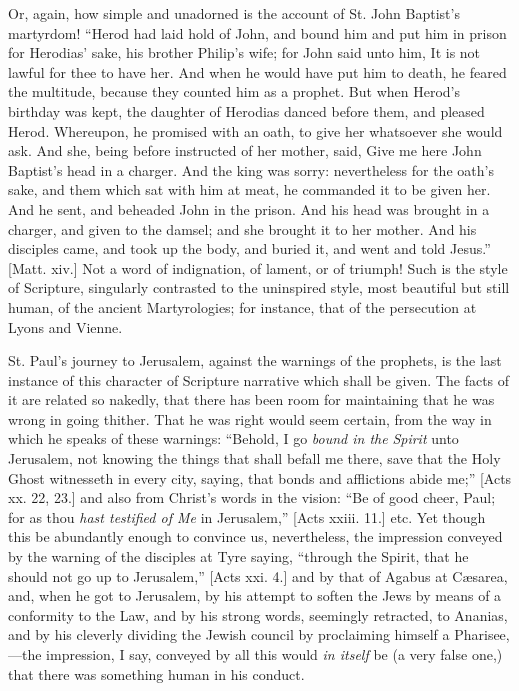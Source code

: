 Or, again, how simple and unadorned is the account of St. John
Baptist's martyrdom! ``Herod had laid hold of John, and bound him
and put him in prison for Herodias' sake, his brother Philip's wife;
for John said unto him, It is not lawful for thee to have her. And
when he would have put him to death, he feared the multitude, because
they counted him as a prophet. But when Herod's birthday was kept, the
daughter of Herodias danced before them, and pleased Herod. Whereupon,
he promised with an oath, to give her whatsoever she would ask. And
she, being before instructed of her mother, said, Give me here John
Baptist's head in a charger. And the king was sorry: nevertheless for
the oath's sake, and them which sat with him at meat, he commanded it
to be given her. And he sent, and beheaded John in the prison. And his
head was brought in a charger, and given to the damsel; and she
brought it to her mother. And his disciples came, and took up the
body, and buried it, and went and told Jesus.'' [Matt. xiv.] Not a
word of indignation, of lament, or of triumph! Such is the style of
Scripture, singularly contrasted to the uninspired style, most
beautiful but still human, of the ancient Martyrologies; for instance,
that of the persecution at Lyons and Vienne.

St. Paul's journey to Jerusalem, against the warnings of the
prophets, is the last instance of this character of Scripture
narrative which shall be given. The facts of it are related so
nakedly, that there has been room for maintaining that he was wrong in
going thither. That he was right would seem certain, from the way in
which he speaks of these warnings: ``Behold, I go \emph{bound in the}
\emph{Spirit} unto Jerusalem, not knowing the things that shall
befall me there, save that the Holy Ghost witnesseth in every city,
saying, that bonds and afflictions abide me;'' [Acts xx. 22, 23.]
and also from Christ's words in the vision: ``Be of good cheer,
Paul; for as thou \emph{hast testified of Me} in Jerusalem,''
[Acts xxiii. 11.] etc. Yet though this be abundantly enough to
convince us, nevertheless, the impression conveyed by the warning of
the disciples at Tyre saying, ``through the Spirit, that he should
not go up to Jerusalem,'' [Acts xxi. 4.] and by that of Agabus at
Cæsarea, and, when he got to Jerusalem, by his attempt to soften the
Jews by means of a conformity to the Law, and by his strong words,
seemingly retracted, to Ananias, and by his cleverly dividing the
Jewish council by proclaiming himself a Pharisee,—the impression, I
say, conveyed by all this would \emph{in itself} be (a very false
one,) that there was something human in his conduct.

